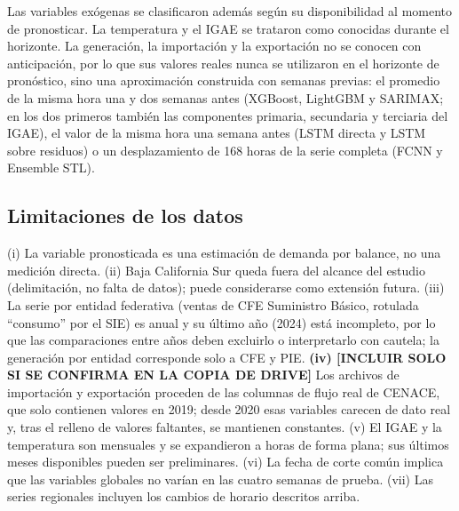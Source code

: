 Las variables exógenas se clasificaron además según su disponibilidad al momento de pronosticar. La temperatura y el IGAE se trataron como conocidas durante el horizonte. La generación, la importación y la exportación no se conocen con anticipación, por lo que sus valores reales nunca se utilizaron en el horizonte de pronóstico, sino una aproximación construida con semanas previas: el promedio de la misma hora una y dos semanas antes (XGBoost, LightGBM y SARIMAX; en los dos primeros también las componentes primaria, secundaria y terciaria del IGAE), el valor de la misma hora una semana antes (LSTM directa y LSTM sobre residuos) o un desplazamiento de 168 horas de la serie completa (FCNN y Ensemble STL).

\subsection{Limitaciones de los datos}

(i) La variable pronosticada es una estimación de demanda por balance, no una medición directa. (ii) Baja California Sur queda fuera del alcance del estudio (delimitación, no falta de datos); puede considerarse como extensión futura. (iii) La serie por entidad federativa (ventas de CFE Suministro Básico, rotulada ``consumo'' por el SIE) es anual y su último año (2024) está incompleto, por lo que las comparaciones entre años deben excluirlo o interpretarlo con cautela; la generación por entidad corresponde solo a CFE y PIE. \textbf{(iv) [INCLUIR SOLO SI SE CONFIRMA EN LA COPIA DE DRIVE]} Los archivos de importación y exportación proceden de las columnas de flujo real de CENACE, que solo contienen valores en 2019; desde 2020 esas variables carecen de dato real y, tras el relleno de valores faltantes, se mantienen constantes. (v) El IGAE y la temperatura son mensuales y se expandieron a horas de forma plana; sus últimos meses disponibles pueden ser preliminares. (vi) La fecha de corte común implica que las variables globales no varían en las cuatro semanas de prueba. (vii) Las series regionales incluyen los cambios de horario descritos arriba.
